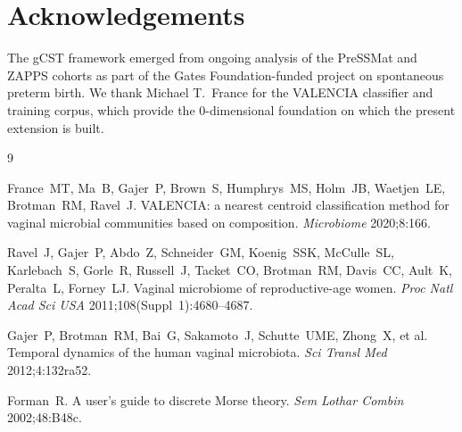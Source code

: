 \documentclass[11pt]{article}
\theoremstyle{plain}
\begin{document}
\section*{Acknowledgements}

The gCST framework emerged from ongoing analysis of the PreSSMat and ZAPPS
cohorts as part of the Gates Foundation-funded project on spontaneous preterm
birth.  We thank Michael T.\ France for the VALENCIA classifier and training
corpus, which provide the 0-dimensional foundation on which the present
extension is built.

\begin{thebibliography}{9}

France~MT, Ma~B, Gajer~P, Brown~S, Humphrys~MS, Holm~JB, Waetjen~LE,
Brotman~RM, Ravel~J.
VALENCIA: a nearest centroid classification method for vaginal microbial
communities based on composition.
\textit{Microbiome} 2020;8:166.

Ravel~J, Gajer~P, Abdo~Z, Schneider~GM, Koenig~SSK, McCulle~SL,
Karlebach~S, Gorle~R, Russell~J, Tacket~CO, Brotman~RM, Davis~CC, Ault~K,
Peralta~L, Forney~LJ.
Vaginal microbiome of reproductive-age women.
\textit{Proc Natl Acad Sci USA} 2011;108(Suppl~1):4680--4687.

Gajer~P, Brotman~RM, Bai~G, Sakamoto~J, Schutte~UME, Zhong~X, et al.
Temporal dynamics of the human vaginal microbiota.
\textit{Sci Transl Med} 2012;4:132ra52.

Forman~R.
A user's guide to discrete Morse theory.
\textit{Sem Lothar Combin} 2002;48:B48c.

\end{thebibliography}
\end{document}
